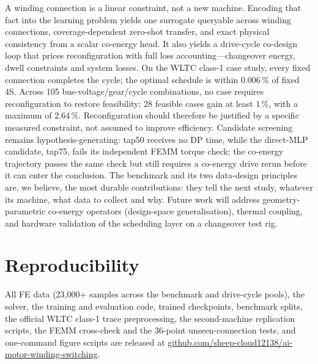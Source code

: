 \documentclass[review]{elsarticle}
\begin{document}
A winding connection is a linear constraint, not a new machine. Encoding
that fact into the learning problem yields one surrogate queryable across
winding connections, coverage-dependent zero-shot transfer, and exact physical
consistency from a scalar co-energy head. It also yields a
drive-cycle co-design loop that prices reconfiguration with full loss
accounting---changeover energy, dwell constraints and system losses. On
the WLTC class-1 case study, every fixed connection completes the cycle;
the optimal schedule is within $0.006\,\%$ of fixed 4S. Across 105
bus-voltage/gear/cycle combinations, no case requires reconfiguration to
restore feasibility; 28 feasible cases gain at least $1\,\%$, with a
maximum of $2.64\,\%$. Reconfiguration should therefore be justified by a
specific
measured constraint, not assumed to improve efficiency. Candidate
screening remains hypothesis-generating: tap50 receives no DP time, while
the direct-MLP candidate, tap75, fails its independent FEMM torque check;
the co-energy trajectory passes the same check but still requires a
co-energy drive rerun before it can enter the conclusion. The benchmark
and its two data-design
principles are, we believe, the most durable contributions: they tell the
next study, whatever its machine, what data to collect and why. Future
work will address geometry-parametric co-energy operators (design-space
generalisation), thermal coupling, and hardware validation of the
scheduling layer on a changeover test rig.

\section*{Reproducibility}

All FE data (23{,}000+ samples across the benchmark and drive-cycle pools),
the solver, the training and evaluation
code, trained checkpoints, benchmark splits, the official WLTC class-1
trace preprocessing, the second-machine replication scripts, the FEMM
cross-check and the 36-point unseen-connection tests, and
one-command figure scripts are released at
\href{https://github.com/sheep-cloud12138/ai-motor-winding-switching}{github.com/sheep-cloud12138/ai-motor-winding-switching}.
\end{document}
